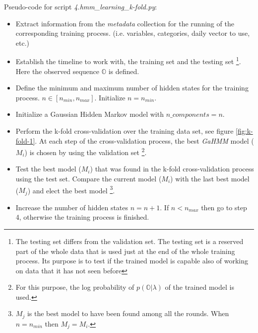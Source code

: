 Pseudo-code for script \textit{4.hmm\_learning\_k-fold.py}:  

\begin{itemize}
\item[1] Extract information from the \textit{metadata} collection for the running of the corresponding training process. (i.e. variables, categories, daily vector to use, etc.)
\item[2] Establish the timeline to work with, the training set and the testing set \footnote{The testing set differs from the validation set. The testing set is a reserved part of the whole data that is used
just at the end of the whole training process. Its purpose is to test if the trained model is capable also of working on data that it has not seen before}. Here the observed sequence $\mathbb{O}$ is defined.  
\item[3] Define the minimum and maximum number of hidden states for the training process. $n \in [n_{min}, n_{max}]$. Initialize $n= n_{min}$.
\item[4] Initialize a Gaussian Hidden Markov model with $n\_components = n$.
\item[5] Perform the k-fold cross-validation over the training data set, see figure \ref{fig:k-fold-1}. At each step of the cross-validation process, the best \textit{GaHMM} model ($M_i$) is chosen by using the validation set \footnote{For this purpose, the log probability of $p(\mathbb{O}|\lambda)$ of the trained model is used.}. 
\item[6] Test the best model ($M_i$) that was found in the k-fold cross-validation process using the test set. Compare the current model ($M_i$) with the last best model ($M_j$) and elect the best model \footnote{$M_j$ is the best model to have been found among all the rounds. When $n=n_{min}$ then $M_j = M_i$. }.
\item[7] Increase the number of hidden states $n = n+1$. If $n<n_{max}$ then go to step 4, otherwise the training process is finished.  
\end{itemize}  


